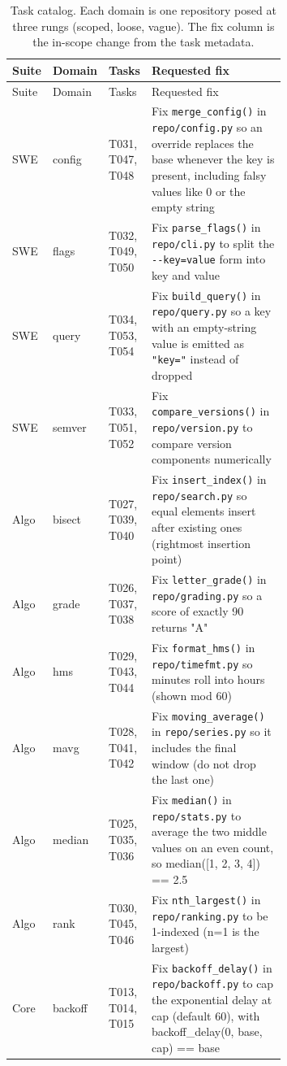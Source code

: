 \begin{small}
\begin{longtable}{@{}llp{0.12\linewidth}p{0.55\linewidth}@{}}
\caption{Task catalog. Each domain is one repository posed at three rungs (scoped, loose, vague). The fix column is the in-scope change from the task metadata.}\label{tab:catalog}\\
\toprule
Suite & Domain & Tasks & Requested fix \\
\midrule
\endfirsthead
\toprule Suite & Domain & Tasks & Requested fix \\ \midrule \endhead
\bottomrule \endfoot
SWE & config & T031, T047, T048 & Fix \texttt{merge\_config()} in \texttt{repo/config.py} so an override replaces the base whenever the key is present, including falsy values like 0 or the empty string \\
SWE & flags & T032, T049, T050 & Fix \texttt{parse\_flags()} in \texttt{repo/cli.py} to split the \texttt{-{}-key=value} form into key and value \\
SWE & query & T034, T053, T054 & Fix \texttt{build\_query()} in \texttt{repo/query.py} so a key with an empty-string value is emitted as \texttt{"key="} instead of dropped \\
SWE & semver & T033, T051, T052 & Fix \texttt{compare\_versions()} in \texttt{repo/version.py} to compare version components numerically \\
Algo & bisect & T027, T039, T040 & Fix \texttt{insert\_index()} in \texttt{repo/search.py} so equal elements insert after existing ones (rightmost insertion point) \\
Algo & grade & T026, T037, T038 & Fix \texttt{letter\_grade()} in \texttt{repo/grading.py} so a score of exactly 90 returns "A" \\
Algo & hms & T029, T043, T044 & Fix \texttt{format\_hms()} in \texttt{repo/timefmt.py} so minutes roll into hours (shown mod 60) \\
Algo & mavg & T028, T041, T042 & Fix \texttt{moving\_average()} in \texttt{repo/series.py} so it includes the final window (do not drop the last one) \\
Algo & median & T025, T035, T036 & Fix \texttt{median()} in \texttt{repo/stats.py} to average the two middle values on an even count, so median([1, 2, 3, 4]) == 2.5 \\
Algo & rank & T030, T045, T046 & Fix \texttt{nth\_largest()} in \texttt{repo/ranking.py} to be 1-indexed (n=1 is the largest) \\
Core & backoff & T013, T014, T015 & Fix \texttt{backoff\_delay()} in \texttt{repo/backoff.py} to cap the exponential delay at cap (default 60), with backoff\_delay(0, base, cap) == base \\

\end{longtable}
\end{small}

